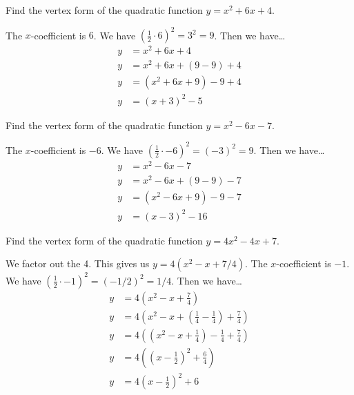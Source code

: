 \documentclass[11pt,letterpaper]{article}
\begin{document}

 Find the vertex form of the quadratic function $y= x^2 + 6x + 4$. \pspace

\sol The $x$-coefficient is $6$. We have $(\frac{1}{2} \cdot 6)^2= 3^2= 9$. Then we have\dots
	\[
	\begin{aligned}
	y&= x^2 + 6x + 4 \\[0.3cm]
	y&= x^2 + 6x + (9 - 9) + 4 \\[0.3cm]
	y&= (x^2 + 6x + 9) - 9 + 4 \\[0.3cm]
	y&= (x + 3)^2 - 5 
	\end{aligned}
	\]





\newpage





 Find the vertex form of the quadratic function $y= x^2 - 6x - 7$. \pspace

\sol The $x$-coefficient is $-6$. We have $(\frac{1}{2} \cdot -6)^2= (-3)^2= 9$. Then we have\dots
	\[
	\begin{aligned}
	y&= x^2 - 6x - 7 \\[0.3cm]
	y&= x^2 - 6x + (9 - 9) - 7 \\[0.3cm]
	y&= (x^2 - 6x + 9) - 9 - 7 \\[0.3cm]
	y&= (x - 3)^2 - 16
	\end{aligned}
	\]





\newpage





 Find the vertex form of the quadratic function $y= 4x^2 - 4x + 7$. \pspace

\sol We factor out the 4. This gives us $y= 4(x^2 - x + 7/4)$. The $x$-coefficient is $-1$. We have $(\frac{1}{2} \cdot -1)^2= (-1/2)^2= 1/4$. Then we have\dots
	\[
	\begin{aligned}
	y&= 4 \left( x^2 - x + \frac{7}{4} \right) \\[0.3cm]
	y&= 4 \left( x^2 - x + \left( \frac{1}{4} - \frac{1}{4} \right) + \frac{7}{4} \right) \\[0.3cm]
	y&= 4 \left( \left( x^2 - x + \frac{1}{4} \right) - \frac{1}{4} + \frac{7}{4} \right) \\[0.3cm]
	y&= 4 \left( \left( x - \frac{1}{2} \right)^2 + \frac{6}{4} \right) \\[0.3cm]
	y&= 4 \left( x - \frac{1}{2} \right)^2 + 6
	\end{aligned}
	\]
\end{document}
